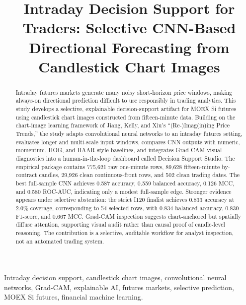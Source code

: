 \title{Intraday Decision Support for Traders: Selective CNN-Based Directional Forecasting from Candlestick Chart Images}

\author{
}

\maketitle

\begin{abstract}
Intraday futures markets generate many noisy short-horizon price windows, making always-on directional prediction difficult to use responsibly in trading analytics. This study develops a selective, explainable decision-support artifact for MOEX Si futures using candlestick chart images constructed from fifteen-minute data. Building on the chart-image learning framework of Jiang, Kelly, and Xiu's ``(Re-)Imag(in)ing Price Trends,'' the study adapts convolutional neural networks to an intraday futures setting, evaluates longer and multi-scale input windows, compares CNN outputs with numeric, momentum, HOG, and HAAR-style baselines, and integrates Grad-CAM visual diagnostics into a human-in-the-loop dashboard called Decision Support Studio. The empirical package contains 775,621 raw one-minute rows, 89,628 fifteen-minute by-contract candles, 29,926 clean continuous-front rows, and 502 clean trading dates. The best full-sample CNN achieves 0.587 accuracy, 0.559 balanced accuracy, 0.126 MCC, and 0.580 ROC-AUC, indicating only a modest full-sample edge. Stronger evidence appears under selective abstention: the strict I120 finalist achieves 0.833 accuracy at 2.0\% coverage, corresponding to 54 selected rows, with 0.834 balanced accuracy, 0.830 F1-score, and 0.667 MCC. Grad-CAM inspection suggests chart-anchored but spatially diffuse attention, supporting visual audit rather than causal proof of candle-level reasoning. The contribution is a selective, auditable workflow for analyst inspection, not an automated trading system.
\end{abstract}

\begin{IEEEkeywords}
Intraday decision support, candlestick chart images, convolutional neural networks, Grad-CAM, explainable AI, futures markets, selective prediction, MOEX Si futures, financial machine learning.
\end{IEEEkeywords}
